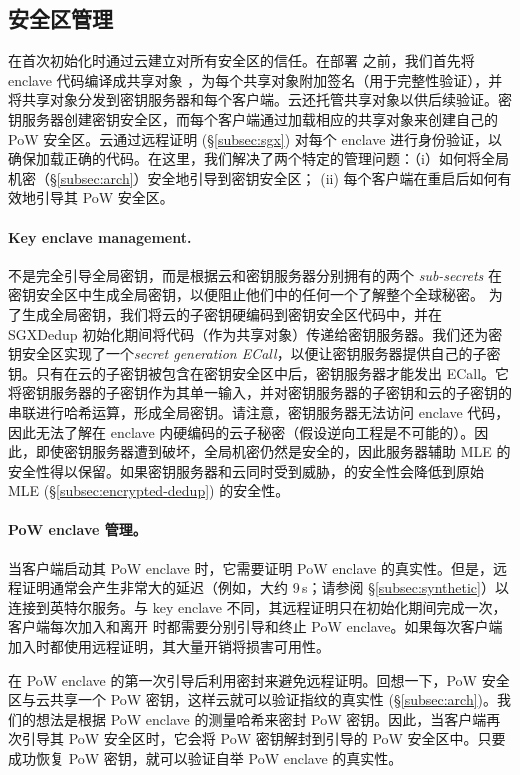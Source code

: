 \subsection{安全区管理}
\label{subsec:enclave-management}

\sysname 在首次初始化时通过云建立对所有安全区的信任。在部署 \sysname 之前，我们首先将 enclave 代码编译成共享对象 \cite{sgx}，为每个共享对象附加签名（用于完整性验证），并将共享对象分发到密钥服务器和每个客户端。云还托管共享对象以供后续验证。密钥服务器创建密钥安全区，而每个客户端通过加载相应的共享对象来创建自己的 PoW 安全区。云通过远程证明 (\S\ref{subsec:sgx}) 对每个 enclave 进行身份验证，以确保加载正确的代码。在这里，我们解决了两个特定的管理问题：（i）如何将全局机密（\S\ref{subsec:arch}）安全地引导到密钥安全区； (ii) 每个客户端在重启后如何有效地引导其 PoW 安全区。

\paragraph{Key enclave management.} \sysname 不是完全引导全局密钥，而是根据云和密钥服务器分别拥有的两个 {\em sub-secrets} 在密钥安全区中生成全局密钥，以便阻止他们中的任何一个了解整个全球秘密。
为了生成全局密钥，我们将云的子密钥硬编码到密钥安全区代码中，并在 SGXDedup 初始化期间将代码（作为共享对象）传递给密钥服务器。我们还为密钥安全区实现了一个{\em secret generation ECall}，以便让密钥服务器提供自己的子密钥。只有在云的子密钥被包含在密钥安全区中后，密钥服务器才能发出 ECall。它将密钥服务器的子密钥作为其单一输入，并对密钥服务器的子密钥和云的子密钥的串联进行哈希运算，形成全局密钥。请注意，密钥服务器无法访问 enclave 代码，因此无法了解在 enclave 内硬编码的云子秘密（假设逆向工程是不可能的）。因此，即使密钥服务器遭到破坏，全局机密仍然是安全的，因此服务器辅助 MLE 的安全性得以保留。如果密钥服务器和云同时受到威胁，\sysname 的安全性会降低到原始 MLE (\S\ref{subsec:encrypted-dedup}) 的安全性。

\paragraph{PoW enclave 管理。} 当客户端启动其 PoW enclave 时，它​​需要证明 PoW enclave 的真实性。但是，远程证明通常会产生非常大的延迟（例如，大约 9\,s；请参阅 \S\ref{subsec:synthetic}）以连接到英特尔服务。与 key enclave 不同，其远程证明只在初始化期间完成一次，客户端每次加入和离开 \sysname 时都需要分别引导和终止 PoW enclave。如果每次客户端加入时都使用远程证明，其大量开销将损害可用性。

\sysname 在 PoW enclave 的第一次引导后利用密封来避免远程证明。回想一下，PoW 安全区与云共享一个 PoW 密钥，这样云就可以验证指纹的真实性 (\S\ref{subsec:arch})。我们的想法是根据 PoW enclave 的测量哈希来密封 PoW 密钥。因此，当客户端再次引导其 PoW 安全区时，它会将 PoW 密钥解封到引导的 PoW 安全区中。只要成功恢复 PoW 密钥，就可以验证自举 PoW enclave 的真实性。

